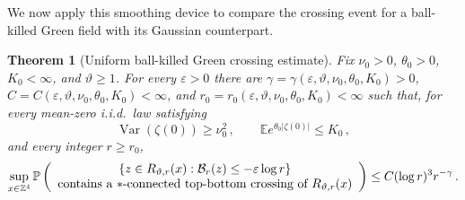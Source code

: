 \documentclass[11pt]{amsart}
\theoremstyle{plain}
\newtheorem{theorem}{Theorem}[section]
\theoremstyle{definition}
\newcommand{\Z}{\mathbb{Z}}
\newcommand{\E}{\mathbb{E}}
\renewcommand{\P}{\mathbb{P}}
\DeclareMathOperator{\Var}{Var}
\begin{document}
We now apply this smoothing device to compare the crossing event for a ball-killed Green field with its Gaussian counterpart.

\begin{theorem}[Uniform ball-killed Green crossing estimate]
\label{thm:d4-ball-green-crossing}
Fix $\nu_{0}>0$, $\theta_{0}>0$, $K_{0}<\infty$, and $\vartheta\geq1$. For every
$\varepsilon>0$ there are $\gamma=\gamma(\varepsilon,\vartheta,\nu_{0},\theta_{0},K_{0})>0$, $C=C(\varepsilon,\vartheta,\nu_{0},\theta_{0},K_{0})<\infty$, and $r_0=r_0(\varepsilon,\vartheta,\nu_{0},\theta_{0},K_{0})<\infty$ such that, for every
mean-zero i.i.d.\ law satisfying
\[
    \Var(\zeta(0))\geq\nu_{0}^2\, ,
    \qquad
    \E e^{\theta_{0}|\zeta(0)|}\leq K_{0}\, ,
\]
and every integer $r\geq r_0$,
\[
\sup_{x\in\Z^4}
\P\left(
\begin{array}{c}
\{z\in R_{\vartheta,r}(x):\mathcal B_r(z)\leq-\varepsilon\log r\}\\
\textup{contains a $\ast$-connected top-bottom crossing of }R_{\vartheta,r}(x)
\end{array}
\right)
\leq C(\log r)^3r^{-\gamma}\, .
\]
\end{theorem}
\end{document}

